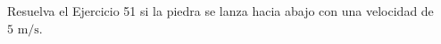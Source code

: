 \item Resuelva el Ejercicio 51 si la piedra se lanza hacia abajo con una velocidad de $5 \text{ m/s}$.

